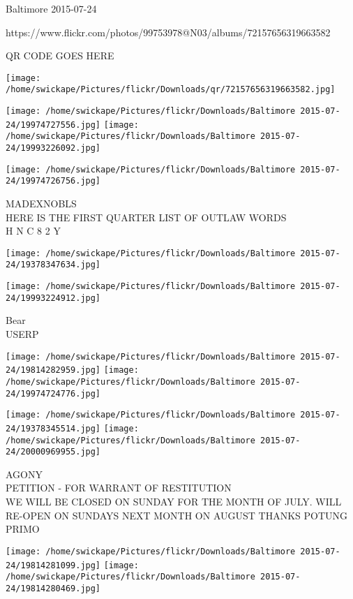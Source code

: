\documentclass[10pt,letterpaper]{article}
\begin{document}
Baltimore 2015-07-24

https://www.flickr.com/photos/99753978@N03/albums/72157656319663582

QR CODE GOES HERE

\texttt{[image: /home/swickape/Pictures/flickr/Downloads/qr/72157656319663582.jpg]}
\pagebreak

\texttt{[image: /home/swickape/Pictures/flickr/Downloads/Baltimore 2015-07-24/19974727556.jpg]}
\texttt{[image: /home/swickape/Pictures/flickr/Downloads/Baltimore 2015-07-24/19993226092.jpg]}

\texttt{[image: /home/swickape/Pictures/flickr/Downloads/Baltimore 2015-07-24/19974726756.jpg]}

MADEXNOBLS\\
HERE IS THE FIRST QUARTER LIST OF OUTLAW WORDS\\
H N C 8 2 Y\\
\pagebreak

\texttt{[image: /home/swickape/Pictures/flickr/Downloads/Baltimore 2015-07-24/19378347634.jpg]}

\vspace{0.25in}
\texttt{[image: /home/swickape/Pictures/flickr/Downloads/Baltimore 2015-07-24/19993224912.jpg]}

Bear\\
USERP\\
\pagebreak

\texttt{[image: /home/swickape/Pictures/flickr/Downloads/Baltimore 2015-07-24/19814282959.jpg]}
\texttt{[image: /home/swickape/Pictures/flickr/Downloads/Baltimore 2015-07-24/19974724776.jpg]}

\texttt{[image: /home/swickape/Pictures/flickr/Downloads/Baltimore 2015-07-24/19378345514.jpg]}
\texttt{[image: /home/swickape/Pictures/flickr/Downloads/Baltimore 2015-07-24/20000969955.jpg]}

AGONY\\
PETITION {-} FOR WARRANT OF RESTITUTION\\
WE WILL BE CLOSED ON SUNDAY FOR THE MONTH OF JULY.  WILL RE{-}OPEN ON SUNDAYS NEXT MONTH ON AUGUST THANKS POTUNG\\
PRIMO\\
\pagebreak

\texttt{[image: /home/swickape/Pictures/flickr/Downloads/Baltimore 2015-07-24/19814281099.jpg]}
\texttt{[image: /home/swickape/Pictures/flickr/Downloads/Baltimore 2015-07-24/19814280469.jpg]}
\end{document}
